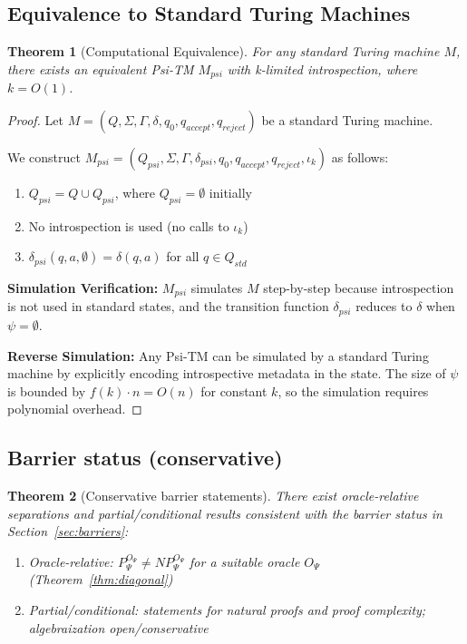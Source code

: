 \documentclass[11pt]{article}
\newtheorem{theorem}{Theorem}
\begin{document}
\subsection{Equivalence to Standard Turing Machines}

\begin{theorem}[Computational Equivalence]
For any standard Turing machine $M$, there exists an equivalent Psi-TM $M_{psi}$ with k-limited introspection, where $k = O(1)$.
\end{theorem}

\begin{proof}
Let $M = (Q, \Sigma, \Gamma, \delta, q_0, q_{accept}, q_{reject})$ be a standard Turing machine.

We construct $M_{psi} = (Q_{psi}, \Sigma, \Gamma, \delta_{psi}, q_0, q_{accept}, q_{reject}, \iota_k)$ as follows:

\begin{enumerate}
\item $Q_{psi} = Q \cup Q_{psi}$, where $Q_{psi} = \emptyset$ initially
\item No introspection is used (no calls to $\iota_k$)
\item $\delta_{psi}(q, a, \emptyset) = \delta(q, a)$ for all $q \in Q_{std}$
\end{enumerate}

\textbf{Simulation Verification:} 
$M_{psi}$ simulates $M$ step-by-step because introspection is not used in standard states, and the transition function $\delta_{psi}$ reduces to $\delta$ when $\psi = \emptyset$.

\textbf{Reverse Simulation:}
Any Psi-TM can be simulated by a standard Turing machine by explicitly encoding introspective metadata in the state. The size of $\psi$ is bounded by $f(k) \cdot n = O(n)$ for constant $k$, so the simulation requires polynomial overhead.
\end{proof}

\subsection{Barrier status (conservative)}

\begin{theorem}[Conservative barrier statements]
There exist oracle-relative separations and partial/conditional results consistent with the barrier status in Section~\ref{sec:barriers}:
\begin{enumerate}
\item Oracle-relative: $P^{O_\Psi}_\Psi \neq NP^{O_\Psi}_\Psi$ for a suitable oracle $O_\Psi$ (Theorem~\ref{thm:diagonal})
\item Partial/conditional: statements for natural proofs and proof complexity; algebraization open/conservative
\end{enumerate}
\end{theorem}
\end{document}
